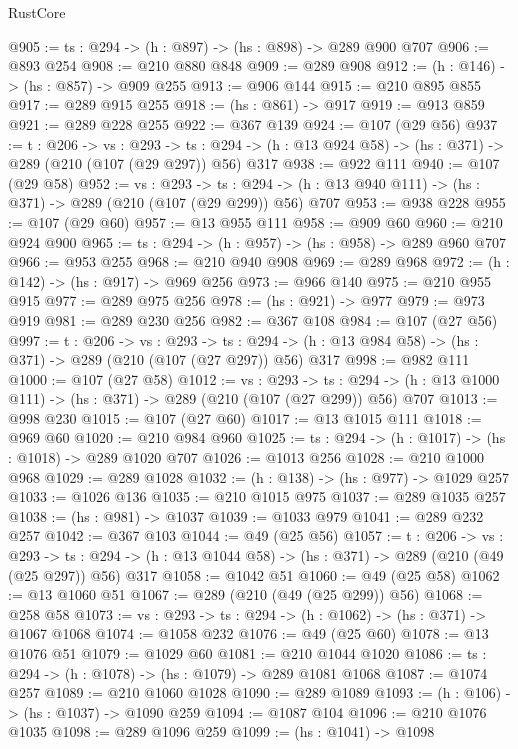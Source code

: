 \begin{lexlean}{RustCore}
\begin{coremodule}
@905 := {ts : @294} -> (h : @897) -> (hs : @898) -> @289 @900 @707
@906 := @893 @254
@908 := @210 @880 @848
@909 := @289 @908
@912 := (h : @146) -> (hs : @857) -> @909 @255
@913 := @906 @144
@915 := @210 @895 @855
@917 := @289 @915 @255
@918 := (hs : @861) -> @917
@919 := @913 @859
@921 := @289 @228 @255
@922 := @367 @139
@924 := @107 (@29 @56)
@937 := {t : @206} ->
  {vs : @293} ->
  {ts : @294} -> (h : @13 @924 @58) -> (hs : @371) -> @289 (@210 (@107 (@29 @297)) @56) @317
@938 := @922 @111
@940 := @107 (@29 @58)
@952 := {vs : @293} ->
  {ts : @294} -> (h : @13 @940 @111) -> (hs : @371) -> @289 (@210 (@107 (@29 @299)) @56) @707
@953 := @938 @228
@955 := @107 (@29 @60)
@957 := @13 @955 @111
@958 := @909 @60
@960 := @210 @924 @900
@965 := {ts : @294} -> (h : @957) -> (hs : @958) -> @289 @960 @707
@966 := @953 @255
@968 := @210 @940 @908
@969 := @289 @968
@972 := (h : @142) -> (hs : @917) -> @969 @256
@973 := @966 @140
@975 := @210 @955 @915
@977 := @289 @975 @256
@978 := (hs : @921) -> @977
@979 := @973 @919
@981 := @289 @230 @256
@982 := @367 @108
@984 := @107 (@27 @56)
@997 := {t : @206} ->
  {vs : @293} ->
  {ts : @294} -> (h : @13 @984 @58) -> (hs : @371) -> @289 (@210 (@107 (@27 @297)) @56) @317
@998 := @982 @111
@1000 := @107 (@27 @58)
@1012 := {vs : @293} ->
  {ts : @294} -> (h : @13 @1000 @111) -> (hs : @371) -> @289 (@210 (@107 (@27 @299)) @56) @707
@1013 := @998 @230
@1015 := @107 (@27 @60)
@1017 := @13 @1015 @111
@1018 := @969 @60
@1020 := @210 @984 @960
@1025 := {ts : @294} -> (h : @1017) -> (hs : @1018) -> @289 @1020 @707
@1026 := @1013 @256
@1028 := @210 @1000 @968
@1029 := @289 @1028
@1032 := (h : @138) -> (hs : @977) -> @1029 @257
@1033 := @1026 @136
@1035 := @210 @1015 @975
@1037 := @289 @1035 @257
@1038 := (hs : @981) -> @1037
@1039 := @1033 @979
@1041 := @289 @232 @257
@1042 := @367 @103
@1044 := @49 (@25 @56)
@1057 := {t : @206} ->
  {vs : @293} ->
  {ts : @294} -> (h : @13 @1044 @58) -> (hs : @371) -> @289 (@210 (@49 (@25 @297)) @56) @317
@1058 := @1042 @51
@1060 := @49 (@25 @58)
@1062 := @13 @1060 @51
@1067 := @289 (@210 (@49 (@25 @299)) @56)
@1068 := @258 @58
@1073 := {vs : @293} -> {ts : @294} -> (h : @1062) -> (hs : @371) -> @1067 @1068
@1074 := @1058 @232
@1076 := @49 (@25 @60)
@1078 := @13 @1076 @51
@1079 := @1029 @60
@1081 := @210 @1044 @1020
@1086 := {ts : @294} -> (h : @1078) -> (hs : @1079) -> @289 @1081 @1068
@1087 := @1074 @257
@1089 := @210 @1060 @1028
@1090 := @289 @1089
@1093 := (h : @106) -> (hs : @1037) -> @1090 @259
@1094 := @1087 @104
@1096 := @210 @1076 @1035
@1098 := @289 @1096 @259
@1099 := (hs : @1041) -> @1098

\end{coremodule}
\end{lexlean}
